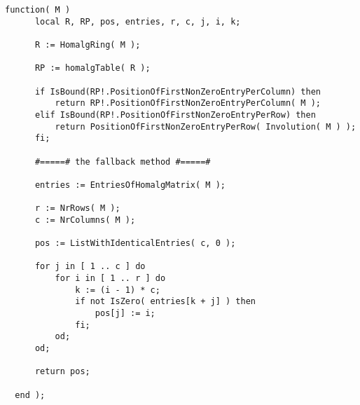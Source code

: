 \documentclass[a4paper,11pt]{report}
\begin{document}
{{{\begin{Verbatim}[fontsize=\small,frame=single,label=Code]
    function( M )
      local R, RP, pos, entries, r, c, j, i, k;
      
      R := HomalgRing( M );
      
      RP := homalgTable( R );
      
      if IsBound(RP!.PositionOfFirstNonZeroEntryPerColumn) then
          return RP!.PositionOfFirstNonZeroEntryPerColumn( M );
      elif IsBound(RP!.PositionOfFirstNonZeroEntryPerRow) then
          return PositionOfFirstNonZeroEntryPerRow( Involution( M ) );
      fi;
      
      #=====# the fallback method #=====#
      
      entries := EntriesOfHomalgMatrix( M );
      
      r := NrRows( M );
      c := NrColumns( M );
      
      pos := ListWithIdenticalEntries( c, 0 );
      
      for j in [ 1 .. c ] do
          for i in [ 1 .. r ] do
              k := (i - 1) * c;
              if not IsZero( entries[k + j] ) then
                  pos[j] := i;
              fi;
          od;
      od;
      
      return pos;
      
  end );
\end{Verbatim}
 }

 }

  }
\end{document}
